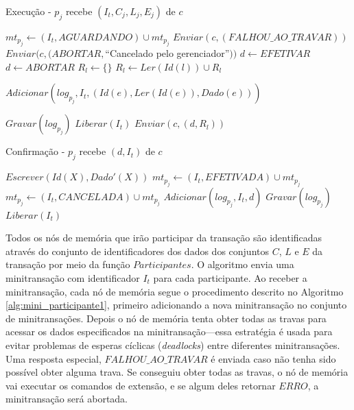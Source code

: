\documentclass[11pt,twoside,a4paper]{book}
\begin{document}
\begin{algorithm}
    \caption{Execução - $p_j$ recebe $(I_t, C_j, L_j, E_j)$ de $c$}
    \label{alg:mini_participante1}
    \begin{algorithmic}[1]
        \State $mt_{p_j} \gets (I_t, AGUARDANDO) \cup mt_{p_j}$
            \State $Enviar(c, (FALHOU\_AO\_TRAVAR))$
            \State $Enviar(c, (ABORTAR, $``Cancelado pelo gerenciador''$))$
        \Else
            \State $d \gets EFETIVAR$
                    \State $d \gets ABORTAR$
                \EndIf
            \EndFor
            \State $R_l \gets \{\}$
                    \State $R_l \gets Ler(Id(l)) \cup R_l$
                \EndFor
                
                    \State $Adicionar(log_{p_j}, I_t, (Id(e), Ler(Id(e)), Dado(e)) )$
                \EndFor

                \State $Gravar(log_{p_j})$
            \Else
                \State $Liberar(I_t)$
            \EndIf
            \State $Enviar(c, (d, R_l))$
        \EndIf
    \end{algorithmic}
\end{algorithm}

\begin{algorithm}
    \caption{Confirmação - $p_j$ recebe $(d, I_t)$ de $c$}
    \label{alg:mini_participante2}
    \begin{algorithmic}[1]
                \State $Escrever(Id(X), Dado'(X))$
            \EndFor
            \State $mt_{p_j} \gets (I_t, EFETIVADA) \cup mt_{p_j}$
        \Else
            \State $mt_{p_j} \gets (I_t, CANCELADA) \cup mt_{p_j}$
        \EndIf
        \State $Adicionar(log_{p_j}, I_t, d)$
        \State $Gravar(log_{p_j})$
        \State $Liberar(I_t)$
    \end{algorithmic}
\end{algorithm}

Todos os nós de memória que irão participar da transação são identificadas através do conjunto de identificadores dos dados dos conjuntos $C$, $L$ e $E$ da transação por meio da função $Participantes$. O algoritmo envia uma minitransação com identificador $I_t$ para cada participante. Ao receber a minitransação, cada nó de memória segue o procedimento descrito no Algoritmo \ref{alg:mini_participante1}, primeiro adicionando a nova minitransação no conjunto de minitransações. Depois o nó de memória tenta obter todas as travas para acessar os dados especificados na minitransação---essa estratégia é usada para evitar problemas de esperas cíclicas (\emph{deadlocks}) entre diferentes minitransações. Uma resposta especial, $FALHOU\_AO\_TRAVAR$ é enviada caso não tenha sido possível obter alguma trava. Se conseguiu obter todas as travas, o nó de memória vai executar os comandos de extensão, e se algum deles retornar $ERRO$, a minitransação será abortada.
\end{document}
